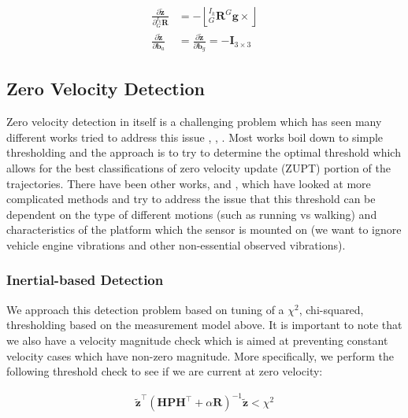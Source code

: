 \begin{align*} \frac{\partial \tilde{\mathbf{z}}}{\partial {}^{I_k}_{G}\mathbf{R}} &= - \left\lfloor {}^{I_k}_G\mathbf{R}{}^G\mathbf{g} \times\right\rfloor \\ \frac{\partial \tilde{\mathbf{z}}}{\partial \mathbf{b}_a} &= \frac{\partial \tilde{\mathbf{z}}}{\partial \mathbf{b}_g} = - \mathbf{I}_{3\times 3} \end{align*}\hypertarget{update-zerovelocity_update-zerovelocity-detect}{}\subsection{Zero Velocity Detection}\label{update-zerovelocity_update-zerovelocity-detect}
Zero velocity detection in itself is a challenging problem which has seen many different works tried to address this issue \cite{Wagstaff2017IPIN}, \cite{Ramanandan2011TITS}, \cite{Davidson2009ENC}. Most works boil down to simple thresholding and the approach is to try to determine the optimal threshold which allows for the best classifications of zero velocity update (Z\+U\+PT) portion of the trajectories. There have been other works, \cite{Wagstaff2017IPIN} and \cite{Ramanandan2011TITS}, which have looked at more complicated methods and try to address the issue that this threshold can be dependent on the type of different motions (such as running vs walking) and characteristics of the platform which the sensor is mounted on (we want to ignore vehicle engine vibrations and other non-\/essential observed vibrations).\hypertarget{update-zerovelocity_update-zerovelocity-detect-imu}{}\subsubsection{Inertial-\/based Detection}\label{update-zerovelocity_update-zerovelocity-detect-imu}
We approach this detection problem based on tuning of a $\chi^2$, chi-\/squared, thresholding based on the measurement model above. It is important to note that we also have a velocity magnitude check which is aimed at preventing constant velocity cases which have non-\/zero magnitude. More specifically, we perform the following threshold check to see if we are current at zero velocity\+:

\begin{align*} \tilde{\mathbf{z}}^\top(\mathbf{H}\mathbf{P}\mathbf{H}^\top + \alpha\mathbf{R})^{-1}\tilde{\mathbf{z}} < \chi^2 \end{align*}

